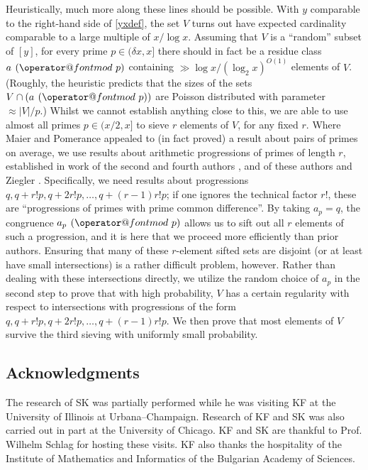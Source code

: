 \documentclass[11pt]{amsart}
\makeatletter
\numberwithin{equation}{section}  %
\theoremstyle{remark}
\theoremstyle{plain}
\numberwithin{equation}{section}
\renewcommand{\pmod}[1]{\allowbreak\mkern7mu({\operator@font mod}\,\,#1)}
\newcommand{\del}{\ensuremath{\delta}}
\renewcommand{\(}{\left(}
\renewcommand{\)}{\right)}
\makeatother
\begin{document}
Heuristically, much more along these lines should be possible. With $y$ comparable to the right-hand side of \eqref{yxdef}, the set $V$ turns out have expected cardinality comparable to a large multiple of $x/\log x$.  Assuming that $V$ is a ``random'' subset of $[y]$, for every 
prime $p\in (\del x,x]$ there should in fact be a residue class $a\pmod p$ containing
$\gg \log x/(\log_2 x)^{O(1)}$ elements of $V$. (Roughly, the heuristic
predicts that the sizes of the sets $V \cap (a\pmod p)$ 
are Poisson distributed with parameter $\approx |V|/p$.) Whilst we
cannot establish anything close to this, we are able to use almost all
primes $p \in (x/2,x]$ to sieve $r$ elements of $V$, for any fixed
  $r$. Where Maier and Pomerance appealed to (in fact proved) a result
  about pairs of primes on average, we use results about arithmetic
  progressions of primes of length $r$, established in work of the
  second and fourth authors \cite{gt-linearprimes},  \cite{gt-nilmobius} and of these authors and
  Ziegler \cite{GTZ}. Specifically, we need results about progressions $q, q+ r!
  p, q+ 2r! p, \dots, q + (r-1)r! p$; if one ignores the technical factor $r!$, these are
  ``progressions of primes with prime common difference''. By taking
  $a_p = q$, the congruence $a_p \pmod{p}$ allows us to sift out all
  $r$ elements of such a progression, and it is here that we proceed
  more efficiently than prior authors. 
Ensuring that many of these $r$-element sifted sets are disjoint (or
at least have small intersections) is a rather difficult
problem, however.  Rather than dealing with these
intersections directly, we utilize the
random choice of $a_p$ in the second step to prove that with high 
probability, $V$ has a certain regularity with respect to 
intersections with progressions of
the form  $q, q+ r! p, q+ 2r! p, \dots, q + (r-1)r! p$.  We then prove
that most elements of $V$ survive the third sieving with uniformly
small probability.

\subsection{Acknowledgments}

The research of SK was partially performed while he was
visiting KF at the University of Illinois at 
Urbana--Champaign.  Research of KF and SK was
also carried out in part at the University of Chicago.
KF and SK are thankful to Prof. Wilhelm Schlag
for hosting these visits.  KF also thanks the
hospitality of the Institute of Mathematics and Informatics of the
Bulgarian Academy of Sciences.
\end{document}
